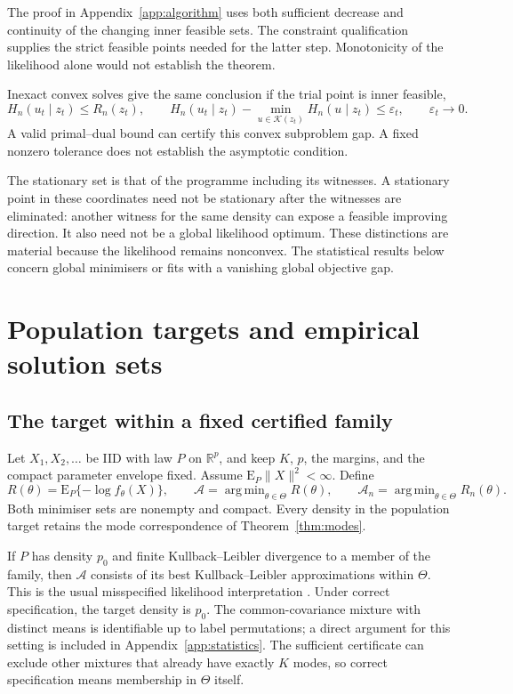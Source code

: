 \documentclass[12pt,a4paper]{article}
\theoremstyle{remark}
\DeclareMathOperator{\argmin}{arg\,min}
\newcommand{\R}{\mathbb R}
\newcommand{\E}{\mathrm E}
\begin{document}
The proof in Appendix~\ref{app:algorithm} uses both sufficient decrease and continuity of the changing inner feasible sets. The constraint qualification supplies the strict feasible points needed for the latter step. Monotonicity of the likelihood alone would not establish the theorem.

Inexact convex solves give the same conclusion if the trial point is inner feasible,
\[
 H_n(u_t\mid z_t)\le R_n(z_t),\qquad
 H_n(u_t\mid z_t)-\min_{u\in\mathcal K(z_t)}H_n(u\mid z_t)
 \le\varepsilon_t,\qquad \varepsilon_t\to0.
\]
A valid primal--dual bound can certify this convex subproblem gap. A fixed nonzero tolerance does not establish the asymptotic condition.

The stationary set is that of the programme including its witnesses. A stationary point in these coordinates need not be stationary after the witnesses are eliminated: another witness for the same density can expose a feasible improving direction. It also need not be a global likelihood optimum. These distinctions are material because the likelihood remains nonconvex. The statistical results below concern global minimisers or fits with a vanishing global objective gap.

\section{Population targets and empirical solution sets}\label{sec:statistics}

\subsection{The target within a fixed certified family}

Let $X_1,X_2,\ldots$ be IID with law $P$ on $\R^p$, and keep $K$, $p$, the margins, and the compact parameter envelope fixed. Assume $\E_P\|X\|^2<\infty$. Define
\begin{equation}\label{eq:population}
 R(\theta)=\E_P\{-\log f_\theta(X)\},\qquad
 \mathcal A=\argmin_{\theta\in\Theta}R(\theta),\qquad
 \mathcal A_n=\argmin_{\theta\in\Theta}R_n(\theta).
\end{equation}
Both minimiser sets are nonempty and compact. Every density in the population target retains the mode correspondence of Theorem~\ref{thm:modes}.

If $P$ has density $p_0$ and finite Kullback--Leibler divergence to a member of the family, then $\mathcal A$ consists of its best Kullback--Leibler approximations within $\Theta$. This is the usual misspecified likelihood interpretation \citep{white1982}. Under correct specification, the target density is $p_0$. The common-covariance mixture with distinct means is identifiable up to label permutations; a direct argument for this setting is included in Appendix~\ref{app:statistics}. The sufficient certificate can exclude other mixtures that already have exactly $K$ modes, so correct specification means membership in $\Theta$ itself.
\end{document}
